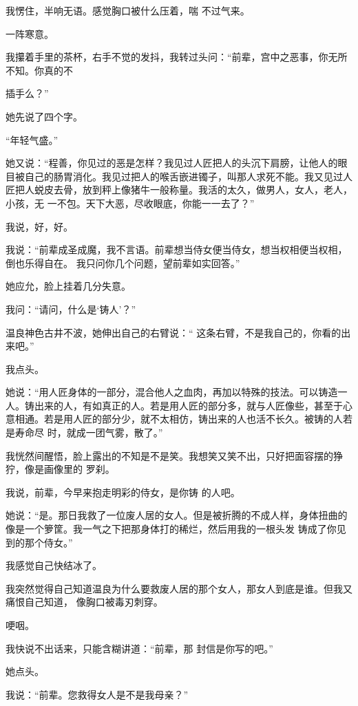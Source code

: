 \documentclass{article}
\begin{document}
我愣住，半响无语。感觉胸口被什么压着，喘
不过气来。 


一阵寒意。 

我攥着手里的茶杯，右手不觉的发抖，我转过头问：“前辈，宫中之恶事，你无所不知。你真的不
\newpage

插手么？” 


她先说了四个字。 


“年轻气盛。” 

她又说：“程善，你见过的恶是怎样？我见过人匠把人的头沉下肩膀，让他人的眼目被自己的肠胃消化。我见过把人的喉舌嵌进镯子，叫那人求死不能。我又见过人匠把人蜕皮去骨，放到秤上像猪牛一般称量。我活的太久，做男人，女人，老人，小孩，无
一不包。天下大恶，尽收眼底，你能一一去了？” 


我说，好，好。 

我说：“前辈成圣成魔，我不言语。前辈想当侍女便当侍女，想当权相便当权相，倒也乐得自在。
我只问你几个问题，望前辈如实回答。” 


她应允，脸上挂着几分失意。 

\newpage


我问：“请问，什么是‘铸人’？” 

温良神色古井不波，她伸出自己的右臂说：“
这条右臂，不是我自己的，你看的出来吧。” 


我点头。 

她说：“用人匠身体的一部分，混合他人之血肉，再加以特殊的技法。可以铸造一人。铸出来的人，有如真正的人。若是用人匠的部分多，就与人匠像些，甚至于心意相通。若是用人匠的部分少，就不太相仿，铸出来的人也活不长久。被铸的人若是寿命尽
时，就成一团气雾，散了。” 

我恍然间醒悟，脸上露出的不知是不是笑。我想笑又笑不出，只好把面容摆的狰狞，像是画像里的
罗刹。 

我说，前辈，今早来抱走明彩的侍女，是你铸
的人吧。 

\newpage

她说：“是。那日我救了一位废人居的女人。但是被折腾的不成人样，身体扭曲的像是一个箩筐。我一气之下把那身体打的稀烂，然后用我的一根头发
铸成了你见到的那个侍女。” 


我感觉自己快结冰了。 

我突然觉得自己知道温良为什么要救废人居的那个女人，那女人到底是谁。但我又痛恨自己知道，
像胸口被毒刃刺穿。 


哽咽。 

我快说不出话来，只能含糊讲道：“前辈，那
封信是你写的吧。” 


她点头。 

我说：“前辈。您救得女人是不是我母亲？”
\end{document}
